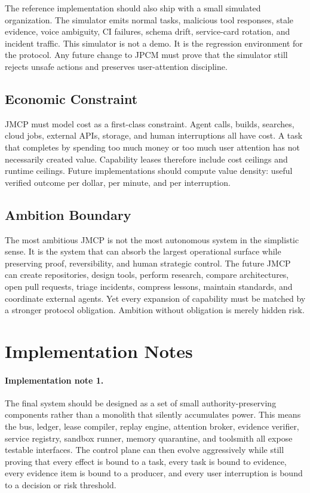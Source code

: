 \documentclass[10pt,journal,onecolumn]{IEEEtran}
\begin{document}
The reference implementation should also ship with a small simulated organization. The simulator emits normal tasks, malicious tool responses, stale evidence, voice ambiguity, CI failures, schema drift, service-card rotation, and incident traffic. This simulator is not a demo. It is the regression environment for the protocol. Any future change to JPCM must prove that the simulator still rejects unsafe actions and preserves user-attention discipline.

\subsection{Economic Constraint}
JMCP must model cost as a first-class constraint. Agent calls, builds, searches, cloud jobs, external APIs, storage, and human interruptions all have cost. A task that completes by spending too much money or too much user attention has not necessarily created value. Capability leases therefore include cost ceilings and runtime ceilings. Future implementations should compute value density: useful verified outcome per dollar, per minute, and per interruption.

\subsection{Ambition Boundary}
The most ambitious JMCP is not the most autonomous system in the simplistic sense. It is the system that can absorb the largest operational surface while preserving proof, reversibility, and human strategic control. The future JMCP can create repositories, design tools, perform research, compare architectures, open pull requests, triage incidents, compress lessons, maintain standards, and coordinate external agents. Yet every expansion of capability must be matched by a stronger protocol obligation. Ambition without obligation is merely hidden risk.

\section{Implementation Notes}
\paragraph{Implementation note 1.} The final system should be designed as a set of small authority-preserving components rather than a monolith that silently accumulates power. This means the bus, ledger, lease compiler, replay engine, attention broker, evidence verifier, service registry, sandbox runner, memory quarantine, and toolsmith all expose testable interfaces. The control plane can then evolve aggressively while still proving that every effect is bound to a task, every task is bound to evidence, every evidence item is bound to a producer, and every user interruption is bound to a decision or risk threshold.
\end{document}
